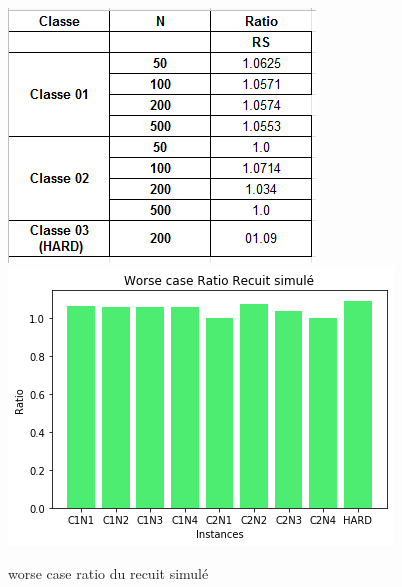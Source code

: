\documentclass[12pt]{article}
\begin{document}
\begin{figure}[H]
    \centering
    \includegraphics[scale=1]{../figures/RS/rs tab ratio.PNG}
    \includegraphics[scale=0.8]{../figures/RS/ratio RS.png}
    \caption{worse case ratio du recuit simulé}
    \label{fig:ratio}
\end{figure}
 
\end{document}
